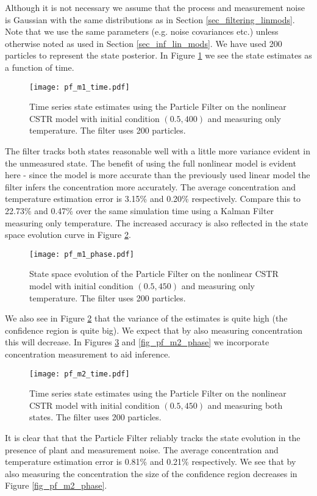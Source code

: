 Although it is not necessary we assume that the process and measurement noise is Gaussian with the same distributions as in Section \ref{sec_filtering_linmods}. Note that we use the same parameters (e.g. noise covariances etc.) unless otherwise noted as used in Section \ref{sec_inf_lin_mods}. We have used 200 particles to represent the state posterior. In Figure \ref{fig_pf_m1_time} we see the state estimates as a function of time.
\begin{figure}[H] 
\centering
\texttt{[image: pf\_m1\_time.pdf]}
\caption{Time series state estimates using the Particle Filter on the nonlinear CSTR model with initial condition $(0.5, 400)$ and measuring only temperature. The filter uses 200 particles.}
\label{fig_pf_m1_time}
\end{figure}
The filter tracks both states reasonable well with a little more variance evident in the unmeasured state. The benefit of using the full nonlinear model is evident here - since the model is more accurate than the previously used linear model the filter infers the concentration more accurately. The average concentration and temperature estimation error is 3.15\% and 0.20\% respectively. Compare this to 22.73\% and 0.47\% over the same simulation time using a Kalman Filter measuring only temperature. The increased accuracy is also reflected in the state space evolution curve in Figure \ref{fig_pf_m1_phase}.
\begin{figure}[H] 
\centering
\texttt{[image: pf\_m1\_phase.pdf]}
\caption{State space evolution of the Particle Filter on the nonlinear CSTR model with initial condition $(0.5, 450)$ and measuring only temperature. The filter uses 200 particles.}
\label{fig_pf_m1_phase}
\end{figure}
We also see in Figure \ref{fig_pf_m1_phase} that the variance of the estimates is quite high (the confidence region is quite big). We expect that by also measuring concentration this will decrease. In Figures \ref{fig_pf_m2_time} and \ref{fig_pf_m2_phase} we incorporate concentration measurement to aid inference. 
\begin{figure}[H] 
\centering
\texttt{[image: pf\_m2\_time.pdf]}
\caption{Time series state estimates using the Particle Filter on the nonlinear CSTR model with initial condition $(0.5, 450)$ and measuring both states. The filter uses 200 particles.}
\label{fig_pf_m2_time}
\end{figure}
It is clear that that the Particle Filter reliably tracks the state evolution in the presence of plant and measurement noise. The average concentration and temperature estimation error is 0.81\% and 0.21\% respectively. We see that by also measuring the concentration the size of the confidence region decreases in Figure \ref{fig_pf_m2_phase}. 
